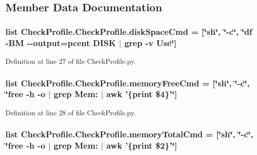 \subsection{Member Data Documentation}
\hypertarget{class_check_profile_1_1_check_profile_a074cbe798e2d4fa35fc83aa33a307b6c}{
\subsubsection[{disk\-Space\-Cmd}]{\setlength{\rightskip}{0pt plus 5cm}list Check\-Profile.\-Check\-Profile.\-disk\-Space\-Cmd = \mbox{[}\char`\"{}sh\char`\"{}, \char`\"{}-\/c\char`\"{}, \char`\"{}df -\/B\-M -\/-\/output=pcent D\-I\-S\-K $\vert$ grep -\/v Use\char`\"{}\mbox{]}\hspace{0.3cm}{\ttfamily [static]}}}\label{class_check_profile_1_1_check_profile_a074cbe798e2d4fa35fc83aa33a307b6c}


Definition at line 27 of file Check\-Profile.\-py.

\hypertarget{class_check_profile_1_1_check_profile_a8a9c2299135872cfccf2b0cb25ba854b}{
\subsubsection[{memory\-Free\-Cmd}]{\setlength{\rightskip}{0pt plus 5cm}list Check\-Profile.\-Check\-Profile.\-memory\-Free\-Cmd = \mbox{[}\char`\"{}sh\char`\"{}, \char`\"{}-\/c\char`\"{}, \char`\"{}free -\/h -\/o $\vert$ grep Mem\-: $\vert$ awk '\{print \$4\}'\char`\"{}\mbox{]}\hspace{0.3cm}{\ttfamily [static]}}}\label{class_check_profile_1_1_check_profile_a8a9c2299135872cfccf2b0cb25ba854b}


Definition at line 28 of file Check\-Profile.\-py.

\hypertarget{class_check_profile_1_1_check_profile_a097bc2442305e7d6eebaff44a53c16f3}{
\subsubsection[{memory\-Total\-Cmd}]{\setlength{\rightskip}{0pt plus 5cm}list Check\-Profile.\-Check\-Profile.\-memory\-Total\-Cmd = \mbox{[}\char`\"{}sh\char`\"{}, \char`\"{}-\/c\char`\"{}, \char`\"{}free -\/h -\/o $\vert$ grep Mem\-: $\vert$ awk '\{print \$2\}'\char`\"{}\mbox{]}\hspace{0.3cm}{\ttfamily [static]}}}\label{class_check_profile_1_1_check_profile_a097bc2442305e7d6eebaff44a53c16f3}


